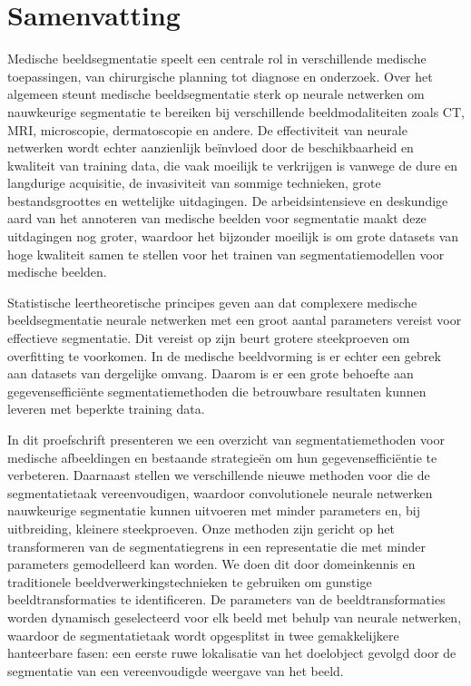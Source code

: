 \chapter{Samenvatting}

Medische beeldsegmentatie speelt een centrale rol in verschillende medische toepassingen, van chirurgische planning tot diagnose en onderzoek. Over het algemeen steunt medische beeldsegmentatie sterk op neurale netwerken om nauwkeurige segmentatie te bereiken bij verschillende beeldmodaliteiten zoals CT, MRI, microscopie, dermatoscopie en andere. De effectiviteit van neurale netwerken wordt echter aanzienlijk beïnvloed door de beschikbaarheid en kwaliteit van training data, die vaak moeilijk te verkrijgen is vanwege de dure en langdurige acquisitie, de invasiviteit van sommige technieken, grote bestandsgroottes en wettelijke uitdagingen. De arbeidsintensieve en deskundige aard van het annoteren van medische beelden voor segmentatie maakt deze uitdagingen nog groter, waardoor het bijzonder moeilijk is om grote datasets van hoge kwaliteit samen te stellen voor het trainen van segmentatiemodellen voor medische beelden.

Statistische leertheoretische principes geven aan dat complexere medische beeldsegmentatie neurale netwerken met een groot aantal parameters vereist voor effectieve segmentatie. Dit vereist op zijn beurt grotere steekproeven om overfitting te voorkomen. In de medische beeldvorming is er echter een gebrek aan datasets van dergelijke omvang. Daarom is er een grote behoefte aan gegevensefficiënte segmentatiemethoden die betrouwbare resultaten kunnen leveren met beperkte training data. 

In dit proefschrift presenteren we een overzicht van segmentatiemethoden voor medische afbeeldingen en bestaande strategieën om hun gegevensefficiëntie te verbeteren. Daarnaast stellen we verschillende nieuwe methoden voor die de segmentatietaak vereenvoudigen, waardoor convolutionele neurale netwerken nauwkeurige segmentatie kunnen uitvoeren met minder parameters en, bij uitbreiding, kleinere steekproeven. Onze methoden zijn gericht op het transformeren van de segmentatiegrens in een representatie die met minder parameters gemodelleerd kan worden. We doen dit door domeinkennis en traditionele beeldverwerkingstechnieken te gebruiken om gunstige beeldtransformaties te identificeren. De parameters van de beeldtransformaties worden dynamisch geselecteerd voor elk beeld met behulp van neurale netwerken, waardoor de segmentatietaak wordt opgesplitst in twee gemakkelijkere hanteerbare fasen: een eerste ruwe lokalisatie van het doelobject gevolgd door de segmentatie van een vereenvoudigde weergave van het beeld.

